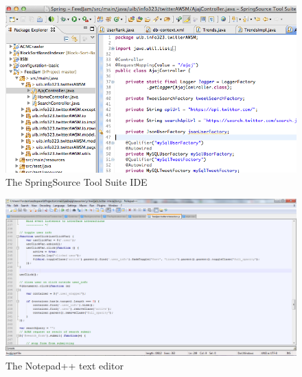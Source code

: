\begin{figure}[ht]
    \begin{minipage}[b]{1\linewidth}
        \centering
        \includegraphics[width=1\textwidth]{figures/springsourcetoolsuite}
        \caption{The SpringSource Tool Suite IDE}
        \label{fig:springsourcetoolsuite}
    \end{minipage}
\end{figure}

\begin{figure}[ht]
    \begin{minipage}[b]{1\linewidth}
        \centering
        \includegraphics[width=1\textwidth]{figures/notepadplusplus}
        \caption{The Notepad++ text editor}
        \label{fig:notepadplusplus}
    \end{minipage}
\end{figure}

